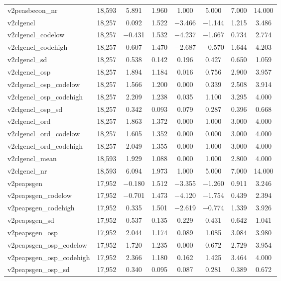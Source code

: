 \begin{table}[!htbp]
\begin{tabular}{@{\extracolsep{5pt}}lccccccc}
v2peasbecon\_nr & 18,593 & 5.891 & 1.960 & 1.000 & 5.000 & 7.000 & 14.000 \\ 
v2clgencl & 18,257 & 0.092 & 1.522 & $-$3.466 & $-$1.144 & 1.215 & 3.486 \\ 
v2clgencl\_codelow & 18,257 & $-$0.431 & 1.532 & $-$4.237 & $-$1.667 & 0.734 & 2.774 \\ 
v2clgencl\_codehigh & 18,257 & 0.607 & 1.470 & $-$2.687 & $-$0.570 & 1.644 & 4.203 \\ 
v2clgencl\_sd & 18,257 & 0.538 & 0.142 & 0.196 & 0.427 & 0.650 & 1.059 \\ 
v2clgencl\_osp & 18,257 & 1.894 & 1.184 & 0.016 & 0.756 & 2.900 & 3.957 \\ 
v2clgencl\_osp\_codelow & 18,257 & 1.566 & 1.200 & 0.000 & 0.339 & 2.508 & 3.914 \\ 
v2clgencl\_osp\_codehigh & 18,257 & 2.209 & 1.238 & 0.035 & 1.100 & 3.295 & 4.000 \\ 
v2clgencl\_osp\_sd & 18,257 & 0.342 & 0.093 & 0.079 & 0.287 & 0.396 & 0.668 \\ 
v2clgencl\_ord & 18,257 & 1.863 & 1.372 & 0.000 & 1.000 & 3.000 & 4.000 \\ 
v2clgencl\_ord\_codelow & 18,257 & 1.605 & 1.352 & 0.000 & 0.000 & 3.000 & 4.000 \\ 
v2clgencl\_ord\_codehigh & 18,257 & 2.049 & 1.355 & 0.000 & 1.000 & 3.000 & 4.000 \\ 
v2clgencl\_mean & 18,593 & 1.929 & 1.088 & 0.000 & 1.000 & 2.800 & 4.000 \\ 
v2clgencl\_nr & 18,593 & 6.094 & 1.973 & 1.000 & 5.000 & 7.000 & 14.000 \\ 
v2peapsgen & 17,952 & $-$0.180 & 1.512 & $-$3.355 & $-$1.260 & 0.911 & 3.246 \\ 
v2peapsgen\_codelow & 17,952 & $-$0.701 & 1.473 & $-$4.120 & $-$1.754 & 0.439 & 2.394 \\ 
v2peapsgen\_codehigh & 17,952 & 0.335 & 1.501 & $-$2.619 & $-$0.774 & 1.339 & 3.926 \\ 
v2peapsgen\_sd & 17,952 & 0.537 & 0.135 & 0.229 & 0.431 & 0.642 & 1.041 \\ 
v2peapsgen\_osp & 17,952 & 2.044 & 1.174 & 0.089 & 1.085 & 3.084 & 3.980 \\ 
v2peapsgen\_osp\_codelow & 17,952 & 1.720 & 1.235 & 0.000 & 0.672 & 2.729 & 3.954 \\ 
v2peapsgen\_osp\_codehigh & 17,952 & 2.366 & 1.180 & 0.162 & 1.425 & 3.464 & 4.000 \\ 
v2peapsgen\_osp\_sd & 17,952 & 0.340 & 0.095 & 0.087 & 0.281 & 0.389 & 0.672 \\ 

\end{tabular}
\end{table}
